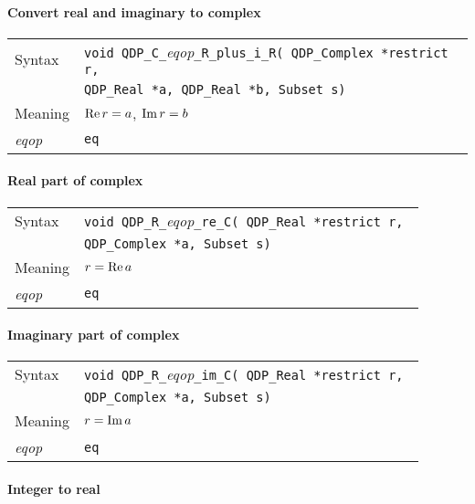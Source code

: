 \documentclass{article}
\renewcommand{\Re}{\mathop{\rm Re}}
\renewcommand{\Im}{\mathop{\rm Im}}
\newcommand{\tReal}{QDP\ttdash Real }
\newcommand{\tComplex}{QDP\ttdash Complex }
\newcommand{\namespace}{QDP}
\newcommand{\ttdash}{{\tt \_}}
\newcommand{\extraarg}{, Subset s}
\newcommand{\protoUnarySingleTypesQual}[5]{{\tt void \namespace}\ttdash{\tt #1}\ttdash{\it eqop}\ttdash#2\ttdash{\tt #3}{\tt ( #4 *restrict r, }\\
  & {\tt #5 *a\extraarg)}}
\begin{document}
\paragraph{Convert real and imaginary to complex}

\begin{flushleft}
  \begin{tabular}{|l|l|}
  \hline
  Syntax      & {\tt void \namespace}\ttdash{\tt C}\ttdash{\it eqop}\ttdash{\tt R\_plus\_i\_R( \tComplex *restrict r,}\\
              & {\tt \tReal *a, \tReal *b\extraarg)} \\
  \hline
  Meaning     & $\Re r = a$, $\Im r = b$ \\
  \hline
  {\it eqop}  & {\tt eq} \\
  \hline
  \end{tabular}
\end{flushleft}

\paragraph{Real part of complex}

\begin{flushleft}
  \begin{tabular}{|l|l|}
  \hline
  Syntax      & \protoUnarySingleTypesQual{R}{\tt re}{C}{\tReal}{\tComplex} \\
  \hline
  Meaning     & $r = \Re a$ \\
  \hline
  {\it eqop}  & {\tt eq} \\
  \hline
  \end{tabular}
\end{flushleft}

\paragraph{Imaginary part of complex}

\begin{flushleft}
  \begin{tabular}{|l|l|}
  \hline
  Syntax      & \protoUnarySingleTypesQual{R}{\tt im}{C}{\tReal}{\tComplex} \\
  \hline
  Meaning     & $r = \Im a$ \\
  \hline
  {\it eqop}  & {\tt eq} \\
  \hline
  \end{tabular}
\end{flushleft}

\paragraph{Integer to real}
\end{document}
